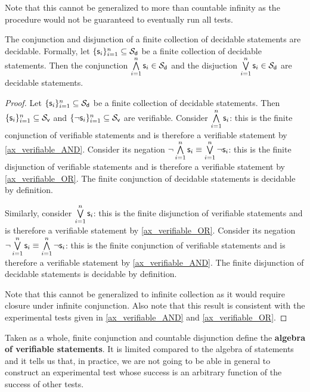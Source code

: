 \documentclass[11pt,letterpaper,fleqn]{memoir} %
\begin{document}
\begin{mathSection}
\begin{justification}
		Note that this cannot be generalized to more than countable infinity as the procedure would not be guaranteed to eventually run all tests.
	\end{justification}
	\begin{prop}\label{prop_decidable_AND_OR}
		The conjunction and disjunction of a finite collection of decidable statements are decidable. Formally, let $\{\mathsf{s}_i\}_{i=1}^{n} \subseteq \mathcal{S}_\textsf{d}$ be a finite collection of decidable statements. Then the conjunction $\bigwedge\limits_{i=1}^{n} \mathsf{s}_i \in \mathcal{S}_\textsf{d}$ and the disjuction $\bigvee\limits_{i=1}^{n} \mathsf{s}_i \in \mathcal{S}_\textsf{d}$ are decidable statements.
	\end{prop}
\begin{proof}
	Let $\{\mathsf{s}_i\}_{i=1}^{n} \subseteq \mathcal{S}_\textsf{d}$ be a finite collection of decidable statements. Then $\{\mathsf{s}_i\}_{i=1}^{n} \subseteq \mathcal{S}_\textsf{v}$ and $\{\neg\mathsf{s}_i\}_{i=1}^{n} \subseteq \mathcal{S}_\textsf{v}$ are verifiable. Consider $\bigwedge\limits_{i=1}^{n} \mathsf{s}_i$: this is the finite conjunction of verifiable statements and is therefore a verifiable statement by \ref{ax_verifiable_AND}. Consider its negation $\neg \bigwedge\limits_{i=1}^{n} \mathsf{s}_i \equiv \bigvee\limits_{i=1}^{n} \neg \mathsf{s}_i$: this is the finite disjunction of verifiable statements and is therefore a verifiable statement by \ref{ax_verifiable_OR}. The finite conjunction of decidable statements is decidable by definition.
	
	Similarly, consider $\bigvee\limits_{i=1}^{n} \mathsf{s}_i$: this is the finite disjunction of verifiable statements and is therefore a verifiable statement by \ref{ax_verifiable_OR}. Consider its negation $\neg \bigvee\limits_{i=1}^{n} \mathsf{s}_i \equiv \bigwedge\limits_{i=1}^{n} \neg \mathsf{s}_i$: this is the finite conjunction of verifiable statements and is therefore a verifiable statement by \ref{ax_verifiable_AND}. The finite disjunction of decidable statements is decidable by definition.
	
	Note that this cannot be generalized to infinite collection as it would require closure under infinite conjunction. Also note that this result is consistent with the experimental tests given in \ref{ax_verifiable_AND} and \ref{ax_verifiable_OR}.
\end{proof}
\end{mathSection}

Taken as a whole, finite conjunction and countable disjunction define the \textbf{algebra of verifiable statements}. It is limited compared to the algebra of statements and it tells us that, in practice, we are not going to be able in general to construct an experimental test whose success is an arbitrary function of the success of other tests.
\end{document}
